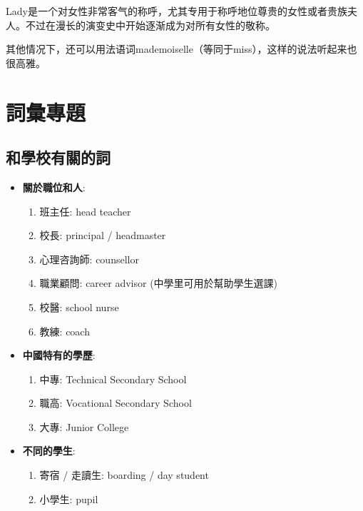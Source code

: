 Lady是一个对女性非常客气的称呼，尤其专用于称呼地位尊贵的女性或者贵族夫人。不过在漫长的演变史中开始逐渐成为对所有女性的敬称。

其他情况下，还可以用法语词mademoiselle（等同于miss），这样的说法听起来也很高雅。

\section{詞彙專題}
\subsection{和學校有關的詞}
\begin{multicols}{2}
\begin{itemize}
  \itemsep0em
  \item \textbf{關於職位和人}:
  \begin{enumerate}
    \itemsep0em
    \item 班主任: head teacher
    \item 校長: principal / headmaster
    \item 心理咨詢師: counsellor
    \item 職業顧問: career advisor (中學里可用於幫助學生選課)
    \item 校醫: school nurse
    \item 教練: coach
  \end{enumerate}
  \item \textbf{中國特有的學歷}:
  \begin{enumerate}
    \itemsep0em
    \item 中專: Technical Secondary School
    \item 職高: Vocational Secondary School
    \item 大專: Junior College
  \end{enumerate}
  \item \textbf{不同的學生}:
  \begin{enumerate}
    \itemsep0em
    \item 寄宿 / 走讀生: boarding / day student
    \item 小學生: pupil
  \end{enumerate}
\end{itemize}
\end{multicols}

